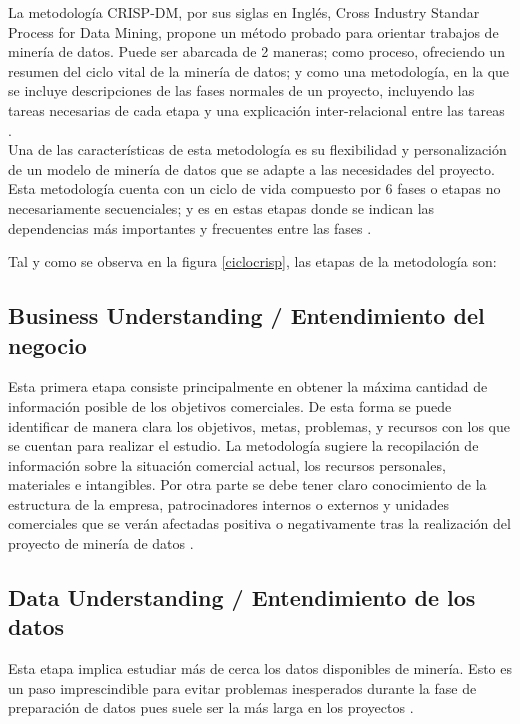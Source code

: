 La metodología CRISP-DM, por sus siglas en Inglés, Cross Industry Standar Process for Data Mining, propone un método probado para orientar trabajos de minería de datos. Puede ser abarcada de 2 maneras; como proceso, ofreciendo un resumen del ciclo vital de la minería de datos; y como una metodología, en la que se incluye descripciones de las fases normales de un proyecto, incluyendo las tareas necesarias de cada etapa y una explicación inter-relacional entre las tareas \cite{ibmcrisp}.\\


Una de las características de esta metodología es su flexibilidad y personalización de un modelo de minería de datos que se adapte a las necesidades del proyecto. Esta metodología cuenta con un ciclo de vida compuesto por 6 fases o etapas no necesariamente secuenciales; y es en estas etapas donde se indican las dependencias más importantes y frecuentes entre las fases \cite{ibmcrisp}.



Tal y como se observa en la figura \ref{ciclocrisp}, las etapas de la metodología son:





\subsection{Business Understanding / Entendimiento del negocio} 
Esta primera etapa consiste principalmente en obtener la máxima cantidad de información posible de los objetivos comerciales. De esta forma se puede identificar de manera clara los objetivos, metas, problemas, y recursos con los que se cuentan para realizar el estudio. La metodología sugiere la recopilación de información sobre la situación comercial actual, los recursos personales, materiales e intangibles. Por otra parte se debe tener claro conocimiento de la estructura de la empresa, patrocinadores internos o externos y unidades comerciales que se verán afectadas positiva o negativamente tras la realización del proyecto de minería de datos \cite{ibmcrisp}.

\subsection{Data Understanding / Entendimiento de los datos}
Esta etapa implica estudiar más de cerca los datos disponibles de minería. Esto es un paso imprescindible para evitar problemas inesperados durante la fase de preparación de datos pues suele ser la más larga en los proyectos \cite{ibmcrisp}.\\

